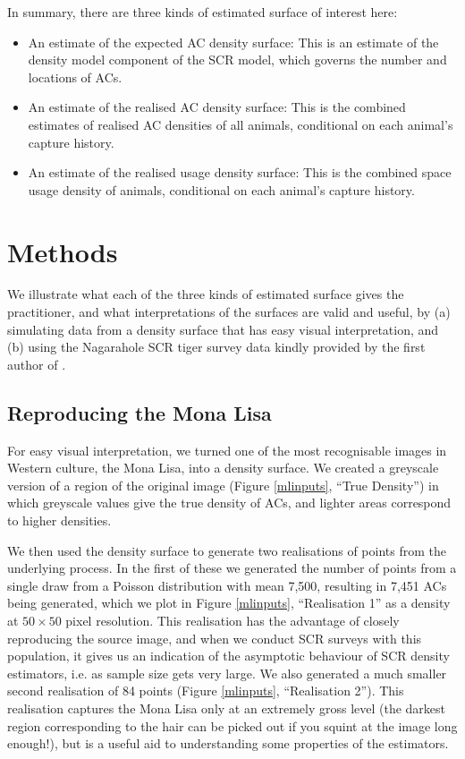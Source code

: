 \documentclass[10pt,a4paper]{article}
\begin{document}
In summary, there are three kinds of estimated surface of interest here: 
\begin{itemize}
\item An estimate of the expected AC density surface: This is an estimate of the density model component of the SCR model, which governs the number and locations of ACs.
\item An estimate of the realised AC density surface: This is the combined estimates of realised AC densities of all animals, conditional on each animal's capture history.
\item An estimate of the realised usage density surface:  This is the combined space usage density of animals, conditional on each animal's capture history.
\end{itemize}

\section{Methods}

We illustrate what each of the three kinds of estimated surface gives the practitioner, and what interpretations of the surfaces are valid and useful, by (a) simulating data from a density surface that has easy visual interpretation, and (b) using the Nagarahole SCR tiger survey data kindly provided by the first author of \cite{Dorazio+Karanth:17}.

\subsection{Reproducing the Mona Lisa} \label{monalisa}

For easy visual interpretation, we turned one of the most recognisable images in Western culture, the Mona Lisa, into a density surface. We created a greyscale version of a region of the original image (Figure \ref{mlinputs}, ``True Density'') in which greyscale values give the true density of ACs, and lighter areas correspond to higher densities.

We then used the density surface to generate two realisations of points from the underlying process. In the first of these we generated the number of points from a single draw from a Poisson distribution with mean 7,500, resulting in 7,451 ACs being generated, which we plot in Figure \ref{mlinputs}, ``Realisation 1'' as a density at $50\times 50$ pixel resolution. This realisation has the advantage of closely reproducing the source image, and when we conduct SCR surveys with this population, it gives us an indication of the asymptotic behaviour of SCR density estimators, i.e. as sample size gets very large. We also generated a much smaller second realisation of 84 points (Figure \ref{mlinputs}, ``Realisation 2''). This realisation captures the Mona Lisa only at an extremely gross level (the darkest region corresponding to the hair can be picked out if you squint at the image long enough!), but is a useful aid to understanding some properties of the estimators.
\end{document}
